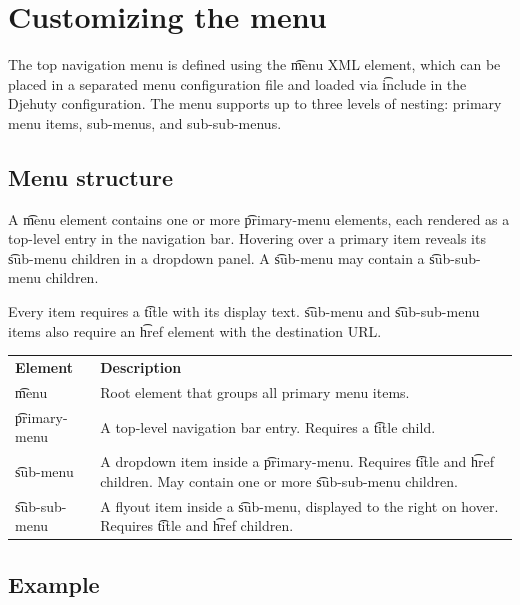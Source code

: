 \section{Customizing the menu}
\label{sec:customize-menu}

  The top navigation menu is defined using the \t{menu} XML element, which can
  be placed in a separated menu configuration file and loaded via \t{include} in the Djehuty
  configuration.
  The menu supports up to three levels of nesting:
  primary menu items, sub-menus, and sub-sub-menus.

\subsection{Menu structure}

  A \t{menu} element contains one or more \t{primary-menu} elements, each
  rendered as a top-level entry in the navigation bar.  Hovering over a primary
  item reveals its \t{sub-menu} children in a dropdown panel.  A \t{sub-menu}
  may contain a \t{sub-sub-menu} children.

  Every item requires a \t{title} with its display text.
  \t{sub-menu} and \t{sub-sub-menu} items also require an \t{href} element
  with the destination URL.

\begin{tabularx}{\textwidth}{*{1}{!{\VRule[-1pt]}l}!{\VRule[-1pt]}X}
  \headrow
  \textbf{Element}    & \textbf{Description}\\
  \t{menu}            & Root element that groups all primary menu items.\\
  \t{primary-menu}    & A top-level navigation bar entry.  Requires a
                        \t{title} child.\\
  \t{sub-menu}        & A dropdown item inside a \t{primary-menu}.  Requires
                        \t{title} and \t{href} children.  May contain one or
                        more \t{sub-sub-menu} children.\\
  \t{sub-sub-menu}    & A flyout item inside a \t{sub-menu}, displayed to the
                        right on hover.  Requires \t{title} and \t{href}
                        children.\\
\end{tabularx}

\subsection{Example}

